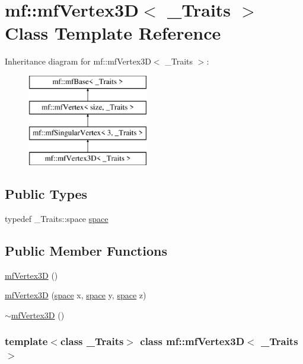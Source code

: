 \hypertarget{classmf_1_1mfVertex3D}{
\section{mf::mfVertex3D$<$ \_\-Traits $>$ Class Template Reference}
\label{classmf_1_1mfVertex3D}
}
Inheritance diagram for mf::mfVertex3D$<$ \_\-Traits $>$:\begin{figure}[H]
\begin{center}
\leavevmode
\includegraphics[height=4.000000cm]{classmf_1_1mfVertex3D}
\end{center}
\end{figure}
\subsection*{Public Types}
\begin{DoxyCompactItemize}
\item 
typedef \_\-Traits::space \hyperlink{classmf_1_1mfVertex3D_a16aa06a4ca21fae048fa56b7a40ac088}{space}
\end{DoxyCompactItemize}
\subsection*{Public Member Functions}
\begin{DoxyCompactItemize}
\item 
\hyperlink{classmf_1_1mfVertex3D_abbd39a1efcb4f29274f6457f9ee4126e}{mfVertex3D} ()
\item 
\hyperlink{classmf_1_1mfVertex3D_a6b9e354109039d64dacf2affbfb7a52d}{mfVertex3D} (\hyperlink{classmf_1_1mfVertex_a9710b0b7ac7bbb276e1e97d541cbfc93}{space} x, \hyperlink{classmf_1_1mfVertex_a9710b0b7ac7bbb276e1e97d541cbfc93}{space} y, \hyperlink{classmf_1_1mfVertex_a9710b0b7ac7bbb276e1e97d541cbfc93}{space} z)
\item 
\hyperlink{classmf_1_1mfVertex3D_aef3a46fb4c8ce5c1ec03e26c7e1b8901}{$\sim$mfVertex3D} ()
\end{DoxyCompactItemize}
\subsubsection*{template$<$class \_\-Traits$>$ class mf::mfVertex3D$<$ \_\-Traits $>$}



